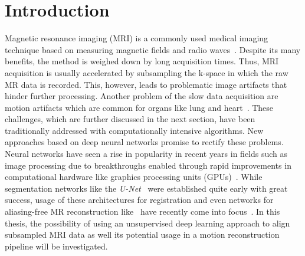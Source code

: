 
\chapter{Introduction} \label{Ch:Introduction}
Magnetic resonance imaging (MRI) is a commonly used medical imaging technique based on measuring magnetic fields and radio waves~\cite{Brown2014,Serai2021,Singh2023}. Despite its many benefits, the method is weighed down by long acquisition times.
Thus, MRI acquisition is usually accelerated by subsampling the k-space in which the raw MR data is recorded. This, however, leads to problematic image artifacts that hinder further processing. Another problem of the slow data acquisition are motion artifacts which are common for organs like lung and heart~\cite{Chen2022}. These challenges, which are further discussed in the next section, have been traditionally addressed with computationally intensive algorithms. New approaches based on deep neural networks promise to rectify these problems. Neural networks have seen a rise in popularity in recent years in fields such as image processing due to breakthroughs enabled through rapid improvements in computational hardware like graphics processing units (GPUs)~\cite{Chen2020}. While segmentation networks like the \emph{U-Net}~\cite{U-Net} were established quite early with great success, usage of these architectures for registration and even networks for aliasing-free MR reconstruction like~\cite{Kuestner2022,Ghoul2024,Pan2024} have recently come into focus~\cite{Chen2020,Haskins2020}. In this thesis, the possibility of using an unsupervised deep learning approach to align subsampled MRI data as well its potential usage in a motion reconstruction pipeline will be investigated.


